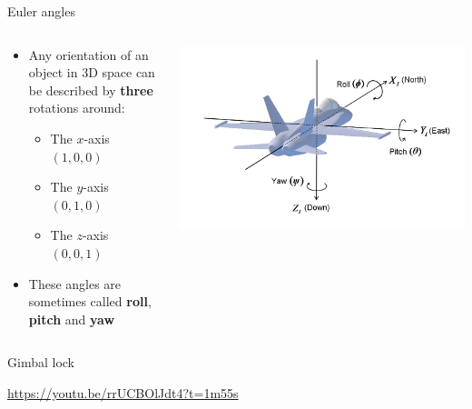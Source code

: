 \begin{frame}{Euler angles}
	\begin{columns}
		\begin{column}{0.48\textwidth}
			\begin{itemize}
				\pause\item Any orientation of an object in 3D space can be described by \textbf{three} rotations around:
					\begin{itemize}
						\pause\item The $x$-axis $(1, 0, 0)$
						\pause\item The $y$-axis $(0, 1, 0)$
						\pause\item The $z$-axis $(0, 0, 1)$
					\end{itemize}
				\pause\item These angles are sometimes called \textbf{roll}, \textbf{pitch} and \textbf{yaw}
			\end{itemize}
		\end{column}
		\begin{column}{0.48\textwidth}
			\includegraphics[width=\textwidth]{euler_aeroplane}
		\end{column}
	\end{columns}
\end{frame}

\begin{frame}{Gimbal lock}
	\begin{center}
		\url{https://youtu.be/rrUCBOlJdt4?t=1m55s}
	\end{center}
\end{frame}



